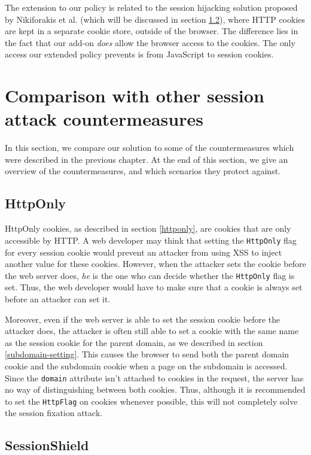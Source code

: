 The extension to our policy is related to the session hijacking solution proposed by Nikiforakis et al. \cite{Nikiforakis2010} (which will be discussed in section \ref{sessionshield}), where HTTP cookies are kept in a separate cookie store, outside of the browser. The difference lies in the fact that our add-on \emph{does} allow the browser access to the cookies. The only access our extended policy prevents is from JavaScript to session cookies.

\section{Comparison with other session attack countermeasures}\label{related-work}%

In this section, we compare our solution to some of the countermeasures which were described in the previous chapter. At the end of this section, we give an overview of the countermeasures, and which scenarios they protect against. %

\subsection{HttpOnly}\label{httponlyremark}

HttpOnly cookies, as described in section \ref{httponly}, are cookies that are only accessible by HTTP. A web developer may think that setting the \texttt{HttpOnly} flag for every session cookie would prevent an attacker from using XSS to inject another value for these cookies. However, when the attacker sets the cookie before the web server does, \emph{he} is the one who can decide whether the \texttt{HttpOnly} flag is set. Thus, the web developer would have to make sure that a cookie is always set before an attacker can set it.

Moreover, even if the web server is able to set the session cookie before the attacker does, the attacker is often still able to set a cookie with the same name as the session cookie for the parent domain, as we described in section \ref{subdomain-setting}. This causes the browser to send both the parent domain cookie and the subdomain cookie when a page on the subdomain is accessed. Since the \texttt{domain} attribute isn't attached to cookies in the request, the server has no way of distinguishing between both cookies. Thus, although it is recommended to set the \texttt{HttpFlag} on cookies whenever possible, this will not completely solve the session fixation attack.

\subsection{SessionShield}\label{sessionshield}
